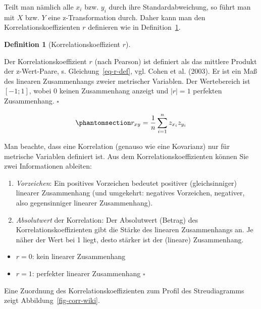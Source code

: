 \documentclass[
  letterpaper,
  twoside,
  open=any]{scrbook}
\providecommand{\tightlist}{%
  \setlength{\itemsep}{0pt}\setlength{\parskip}{0pt}}\usepackage{longtable,booktabs,array}
\theoremstyle{definition}
\theoremstyle{definition}
\theoremstyle{definition}
\newtheorem{definition}{Definition}[chapter]
\theoremstyle{remark}
\begin{document}
Teilt man nämlich alle \(x_i\) bzw. \(y_i\) durch ihre
Standardabweichung, so führt man mit \(X\) bzw. \(Y\) eine
z-Transformation durch. Daher kann man den Korrelationskoeffizienten
\(r\) definieren wie in Definition~\ref{def-r}.

\begin{definition}[Korrelationskoeffizient
\(r\)]\protect\hypertarget{def-r}{}\label{def-r}

Der Korrelationskoeffizient \(r\) (nach Pearson) ist definiert als das
mittlere Produkt der z-Wert-Paare, s. Gleichung~\ref{eq-r-def}, vgl.
Cohen et al. (2003). Er ist ein Maß des linearen Zusammenhangs zweier
metrischer Variablen. Der Wertebereich ist \([-1;1]\), wobei 0 keinen
Zusammenhang anzeigt und \(|r|=1\) perfekten Zusammenhang. \(\square\)

\end{definition}

\begin{equation}\phantomsection\label{eq-r-def}{r_{xy}=\frac{1}{n}\sum_{i=1}^n z_{x_i} z_{y_i}}\end{equation}

Man beachte, dass eine Korrelation (genauso wie eine Kovarianz) nur für
metrische Variablen definiert ist. Aus dem Korrelationskoeffizienten
können Sie zwei Informationen ableiten:

\begin{enumerate}
\def\labelenumi{\arabic{enumi}.}
\tightlist
\item
  \emph{Vorzeichen}: Ein positives Vorzeichen bedeutet positiver
  (gleichsinniger) linearer Zusammenhang (und umgekehrt: negatives
  Vorzeichen, negativer, also gegensinniger linearer Zusammenhang).
\item
  \emph{Absolutwert} der Korrelation: Der Absolutwert (Betrag) des
  Korrelationskoeffizienten gibt die Stärke des linearen Zusammenhangs
  an. Je näher der Wert bei 1 liegt, desto stärker ist der (lineare)
  Zusammenhang.
\end{enumerate}

\begin{itemize}
\tightlist
\item
  \(r = 0\): kein linearer Zusammenhang
\item
  \(r = 1\): perfekter linearer Zusammenhang \(\square\)
\end{itemize}

Eine Zuordnung des Korrelationskoeffizienten zum Profil des
Streudiagramms zeigt Abbildung~\ref{fig-corr-wiki}.
\end{document}
